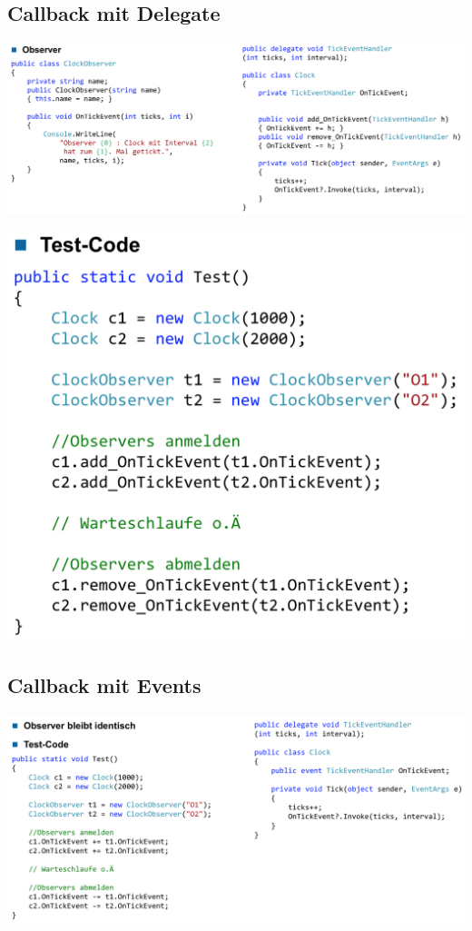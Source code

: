 \documentclass[
a4paper,
oneside,
10pt,
fleqn,
headsepline,
toc=listofnumbered, 
bibliography=totocnumbered]{scrartcl}
\begin{document}
\subsection{Callback mit Delegate}

\includegraphics[scale=0.3]{images/callback_delegates}

\includegraphics[scale=0.3]{images/callback_delegates_test}

\subsection{Callback mit Events}

\includegraphics[scale=0.3]{images/callback_events}
\end{document}
